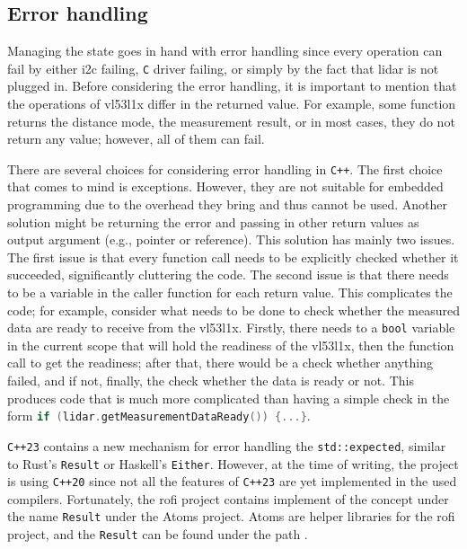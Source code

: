 \documentclass[
  digital,     %
  oneside,     %
  nosansbold,  %
  nocolorbold, %
  nolof,         %
  nolot,         %
]{fithesis4}
\begin{document}
\subsection{Error handling}
Managing the state goes in hand with error handling since every operation can fail by either
\acrshort{i2c} failing, \verb|C| driver failing, or simply by the fact that \acrshort{lidar} is not
plugged in. Before considering the error handling, it is important to mention that the operations of
\gls{vl53l1x} differ in the returned value. For example, some function returns the distance mode,
the measurement result, or in most cases, they do not return any value; however, all of them can
fail.

There are several choices for considering error handling in \verb|C++|. The first choice that comes
to mind is exceptions. However, they are not suitable for embedded programming due to the overhead
they bring and thus cannot be used. Another solution might be returning the error and passing in
other return values as output argument (e.g., pointer or reference). This solution has mainly two
issues. The first issue is that every function call needs to be explicitly checked whether it
succeeded, significantly cluttering the code. The second issue is that there needs to be a variable
in the caller function for each return value. This complicates the code; for example, consider what
needs to be done to check whether the measured data are ready to receive from the \gls{vl53l1x}.
Firstly, there needs to a \lstinline|bool| variable in the current scope that will hold the
readiness of the \gls{vl53l1x}, then the function call to get the readiness; after that, there would
be a check whether anything failed, and if not, finally, the check whether the data is ready or not.
This produces code that is much more complicated than having a simple check in the form
\lstinline[breaklines=false,language=c++]|if (lidar.getMeasurementDataReady()) {...}|.

\verb|C++23| contains a new mechanism for error handling the \lstinline|std::expected|, similar to
Rust's \lstinline|Result| or Haskell's \lstinline|Either|. However, at the time of writing, the
project is using \verb|C++20| since not all the features of \verb|C++23| are yet implemented in the
used compilers. Fortunately, the \acrshort{rofi} project contains implement of the concept under the
name \lstinline|Result| under the Atoms project. Atoms are helper libraries for the \acrshort{rofi}
project, and the \lstinline|Result| can be found under the path
.
\end{document}
